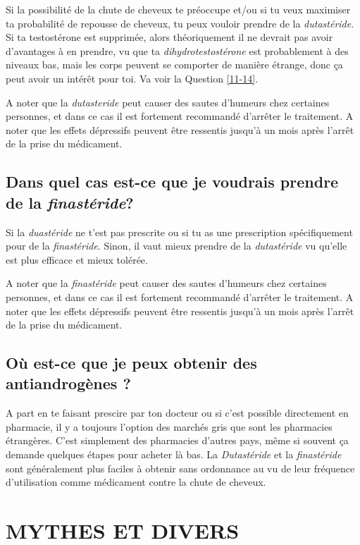 \documentclass{article}
\begin{document}
Si la possibilité de la chute de cheveux te préoccupe et/ou si tu veux maximiser ta probabilité de repousse de cheveux, tu peux vouloir prendre de la \textit{dutastéride}. Si ta testostérone est supprimée, alors théoriquement il ne devrait pas avoir d'avantages à en prendre, vu que ta \textit{dihydrotestostérone} est probablement à des niveaux bas, mais les corps peuvent se comporter de manière étrange, donc ça peut avoir un intérêt pour toi. Va voir la Question \ref{11-14}.

A noter que la \textit{dutasteride} peut causer des sautes d'humeurs chez certaines personnes, et dans ce cas il est fortement recommandé d'arrêter le traitement. A noter que les effets dépressifs peuvent être ressentis jusqu'à un mois après l'arrêt de la prise du médicament.

\subsection{Dans quel cas est-ce que je voudrais prendre de la \textit{finastéride}?}

Si la \textit{duastéride} ne t'est pas prescrite ou si tu as une prescription spécifiquement pour de la \textit{finastéride}. Sinon, il vaut mieux prendre de la \textit{dutastéride} vu qu'elle est plus efficace et mieux tolérée.

A noter que la \textit{finastéride} peut causer des sautes d'humeurs chez certaines personnes, et dans ce cas il est fortement recommandé d'arrêter le traitement. A noter que les effets dépressifs peuvent être ressentis jusqu'à un mois après l'arrêt de la prise du médicament.

\subsection{Où est-ce que je peux obtenir des antiandrogènes ?}

A part en te faisant prescire par ton docteur ou si c'est possible directement en pharmacie, il y a toujours l'option des marchés gris que sont les pharmacies étrangères. C'est simplement des pharmacies d'autres pays, même si souvent ça demande quelques étapes pour acheter là bas. La \textit{Dutastéride} et la \textit{finastéride} sont généralement plus faciles à obtenir sans ordonnance au vu de leur fréquence d'utilisation comme médicament contre la chute de cheveux.
 

\section{MYTHES ET DIVERS}\label{MM}
\end{document}
